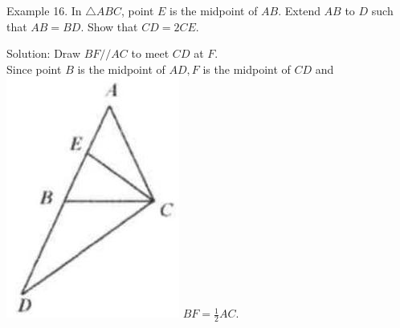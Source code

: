 \documentclass[10pt]{article}
\begin{document}
Example 16. In \(\triangle A B C\), point \(E\) is the midpoint of \(A B\). Extend \(A B\) to \(D\) such that \(A B=B D\). Show that \(C D=2 C E\).

Solution:
Draw \(B F / / A C\) to meet \(C D\) at \(F\).\\
Since point \(B\) is the midpoint of \(A D, F\) is the midpoint of \(C D\) and\\
\includegraphics[max width=\textwidth]{2025_04_17_97bc1f7e44d93c271a88g-118(1)} \(B F=\frac{1}{2} A C\).
\end{document}
